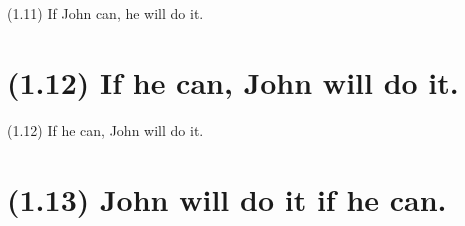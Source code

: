 \documentclass{article}
\begin{document}
\bigbreak
\begin{enumerate*}
\item[(1.11)] If John can, he will do it.
\end{enumerate*}
\bigbreak

\bigbreak
\begin{minipage}{\textwidth}
\end{minipage}
\bigbreak

\clearpage

%
%

\section*{(1.12) If he can, John will do it.}

\bigbreak
\begin{enumerate*}
\item[(1.12)] If he can, John will do it.
\end{enumerate*}
\bigbreak

\bigbreak
\begin{minipage}{\textwidth}
\end{minipage}
\bigbreak

\clearpage

%
%

\section*{(1.13) John will do it if he can.}
\end{document}
